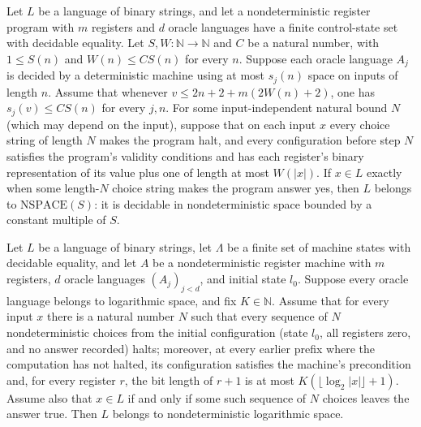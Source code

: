 \begin{theorem}
\label{Complexity.LogProg.narm_decides_space}
\leanok
{}
Let $L$ be a language of binary strings, and let a nondeterministic register program
with $m$ registers and $d$ oracle languages have a finite control-state set with
decidable equality. Let $S,W:\mathbb{N}\to\mathbb{N}$ and $C$ be a natural number, with
$1\le S(n)$ and $W(n)\le C S(n)$ for every $n$. Suppose each oracle language $A_j$ is
decided by a deterministic machine using at most $s_j(n)$ space on inputs of length $n$.
Assume that whenever $v\le 2n+2+m(2W(n)+2)$, one has $s_j(v)\le C S(n)$ for every $j,n$.
For some input-independent natural bound $N$ (which may depend on the input), suppose
that on each input $x$ every choice string of length $N$ makes the program halt, and
every configuration before step $N$ satisfies the program's validity conditions and has
each register's binary representation of its value plus one of length at most $W(|x|)$.
If $x\in L$ exactly when some length-$N$ choice string makes the program answer yes,
then $L$ belongs to $\text{NSPACE}(S)$: it is decidable in nondeterministic space bounded
by a constant multiple of $S$.
\end{theorem}

\begin{theorem}
\label{Complexity.LogProg.narm_decides}
\leanok
{}
Let $L$ be a language of binary strings, let $\Lambda$ be a finite set of machine
states with decidable equality, and let $A$ be a nondeterministic register machine with
$m$ registers, $d$ oracle languages $(A_j)_{j<d}$, and initial state $l_0$. Suppose
every oracle language belongs to logarithmic space, and fix $K\in\mathbb{N}$. Assume
that for every input $x$ there is a natural number $N$ such that every sequence of $N$
nondeterministic choices from the initial configuration (state $l_0$, all registers
zero, and no answer recorded) halts; moreover, at every earlier prefix where the
computation has not halted, its configuration satisfies the machine's precondition and,
for every register $r$, the bit length of $r+1$ is at most $K(\lfloor\log_2
|x|\rfloor+1)$. Assume also that $x\in L$ if and only if some such sequence of $N$
choices leaves the answer true. Then $L$ belongs to nondeterministic logarithmic space.
\end{theorem}


